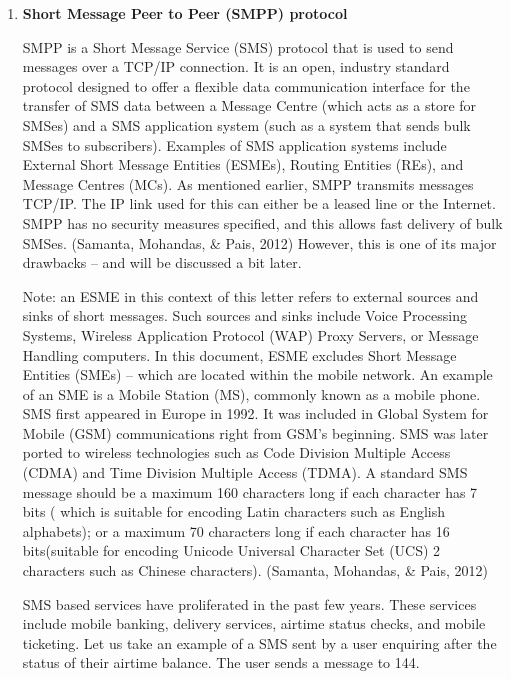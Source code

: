 \documentclass[12pt,svgnames,smaller]{article} %
\begin{document}
	\begin{enumerate}
		
		\item \textbf{ Short Message Peer to Peer (SMPP) protocol }
		
		SMPP is a Short Message Service (SMS) protocol that is used to send messages over a TCP/IP connection. It is an open, industry standard protocol designed to offer a flexible data communication interface for the transfer of SMS data between a Message Centre (which acts as a store for SMSes) and a SMS application system (such as a system that sends bulk SMSes to subscribers). Examples of SMS application systems include External Short Message Entities (ESMEs), Routing Entities (REs), and Message Centres (MCs). As mentioned earlier, SMPP transmits messages TCP/IP. The IP link used for this can either be a leased line or the Internet. SMPP has no security measures specified, and this allows fast delivery of bulk SMSes. (Samanta, Mohandas, \& Pais, 2012) However, this is one of its major drawbacks – and will be discussed a bit later.
		
		Note: an ESME in this context of this letter refers to external sources and sinks of short messages. Such sources and sinks include Voice Processing Systems, Wireless Application Protocol (WAP) Proxy Servers, or Message Handling computers. In this document, ESME excludes Short Message Entities (SMEs) – which are located within the mobile network. An example of an SME is a Mobile Station (MS), commonly known as a mobile phone.
		SMS first appeared in Europe in 1992. It was included in Global System for Mobile (GSM) communications right from GSM’s beginning. SMS was later ported to wireless technologies such as Code Division Multiple Access (CDMA) and Time Division Multiple Access (TDMA). A standard SMS message should be a maximum 160 characters long if each character has 7 bits ( which is suitable for encoding Latin characters such as English alphabets); or a maximum 70 characters long if each character has 16 bits(suitable for encoding Unicode Universal Character Set (UCS) 2 characters such as Chinese characters). (Samanta, Mohandas, \& Pais, 2012)
		
		SMS based services have proliferated in the past few years. These services include mobile banking, delivery services, airtime status checks, and mobile ticketing. Let us take an example of a SMS sent by a user enquiring after the status of their airtime balance. The user sends a message to 144.
		

\end{enumerate}
\end{document}
